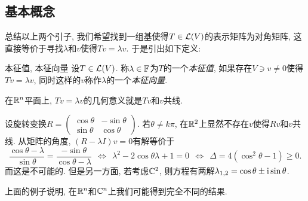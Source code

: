 \subsection{基本概念}

总结以上两个引子, 我们希望找到一组基使得$T \in \mathcal{L} (V)$的表示矩阵为对角矩阵, 这直接等价于寻找$\lambda$和$v$使得$Tv=\lambda v$. 于是引出如下定义: 

\begin{definition}{本征值, 本征向量}
	设$T \in \mathcal{L} (V)$. 称$\lambda \in \mathbb{F}$为$T$的一个\textit{本征值}, 如果存在$V \ni v \neq 0$使得$Tv = \lambda v$, 同时这样的$v$称作$\lambda $的一个\textit{本征向量}. 
\end{definition}

在$\mathbb{R} ^n$平面上, $Tv=\lambda v$的几何意义就是$Tv$和$v$共线. 

\begin{example}
	设旋转变换$R = \begin{pmatrix}
 \cos \theta & -\sin \theta \\
 \sin \theta & \cos \theta
\end{pmatrix}$. 若$\theta \neq k\pi$, 在$\mathbb{R} ^2$上显然不存在$v$使得$Rv$和$v$共线. 从矩阵的角度, $(R-\lambda I)v=0$有解等价于$$\frac{\cos \theta - \lambda}{\sin \theta} = \frac{-\sin \theta}{\cos \theta - \lambda} ~~\Leftrightarrow ~~\lambda ^2 - 2\cos \theta \lambda + 1 = 0~~\Leftrightarrow ~~\Delta = 4(\cos ^2 \theta - 1) \geq 0. $$
而这是不可能的. 但是另一方面, 若考虑$\mathbb{C} ^2$, 则方程有两解$\lambda _{1,2} = \cos \theta \pm \operatorname{i} \sin \theta$. 
\end{example}

上面的例子说明, 在$\mathbb{R} ^n$和$\mathbb{C} ^n$上我们可能得到完全不同的结果. 














